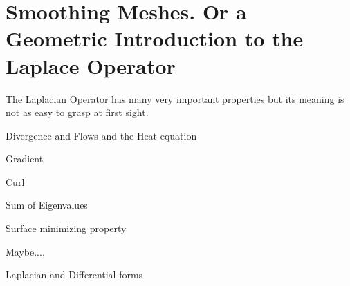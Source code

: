 \chapter{Smoothing Meshes. Or a Geometric Introduction to the Laplace Operator}
	The Laplacian Operator has many very important properties but its meaning is not as easy to grasp at first sight. 
	
	Divergence and Flows and the Heat equation
	
	Gradient
	
	Curl
	
	Sum of Eigenvalues
	
	Surface minimizing property
	
	Maybe....
	
	Laplacian and Differential forms